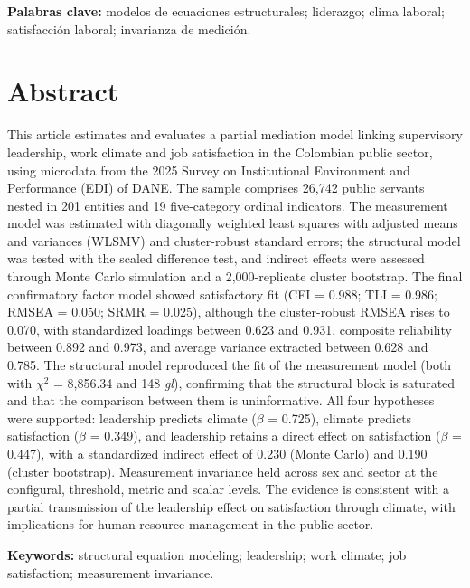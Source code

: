\documentclass[11pt,a4paper]{article}
\newcommand{\chisq}{$\chi^2$}
\newcommand{\df}{\textit{gl}}
\begin{document}
\vspace{6pt}
\noindent\textbf{Palabras clave:} modelos de ecuaciones estructurales; liderazgo;
clima laboral; satisfacción laboral; invarianza de medición.

\vspace{10pt}
\section*{Abstract}

This article estimates and evaluates a partial mediation model linking supervisory
leadership, work climate and job satisfaction in the Colombian public sector, using
microdata from the 2025 Survey on Institutional Environment and Performance (EDI) of DANE.
The sample comprises 26,742 public servants nested in 201 entities and 19 five-category
ordinal indicators. The measurement model was estimated with diagonally weighted least
squares with adjusted means and variances (WLSMV) and cluster-robust standard errors; the
structural model was tested with the scaled difference test, and indirect effects were
assessed through Monte Carlo simulation and a 2,000-replicate cluster bootstrap. The final
confirmatory factor model showed satisfactory fit (CFI = 0.988; TLI = 0.986;
RMSEA = 0.050; SRMR = 0.025), although the cluster-robust RMSEA rises to 0.070, with
standardized loadings between 0.623 and 0.931,
composite reliability between 0.892 and 0.973, and average variance extracted between
0.628 and 0.785. The structural model reproduced the fit of the measurement model (both
with \chisq{} = 8,856.34 and 148 \df), confirming that the structural block is saturated and
that the comparison between them is uninformative. All four hypotheses were supported:
leadership predicts climate ($\beta$ = 0.725), climate predicts satisfaction
($\beta$ = 0.349), and leadership retains a direct effect on satisfaction
($\beta$ = 0.447), with a standardized indirect effect of 0.230 (Monte Carlo) and 0.190
(cluster bootstrap). Measurement invariance held
across sex and sector at the configural, threshold, metric and scalar levels. The evidence is
consistent with a partial transmission of the leadership effect on satisfaction through
climate, with implications for human resource management in the public sector.

\vspace{6pt}
\noindent\textbf{Keywords:} structural equation modeling; leadership; work climate; job
satisfaction; measurement invariance.
\end{document}
